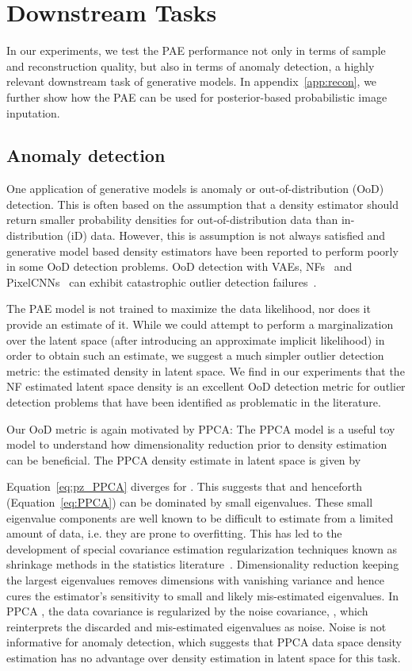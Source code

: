\documentclass[10pt]{article} \usepackage[accepted]{tmlr}
\newcommand{\rev}[1]{{\color{black}#1}}
\begin{document}
\section{Downstream Tasks}
In our experiments, we test the PAE performance not only in terms of sample and reconstruction quality, but also in terms of anomaly detection, a highly relevant downstream task of generative models. In appendix~\ref{app:recon}, we further show how the PAE can be used for posterior-based probabilistic image inputation.  

\subsection{Anomaly detection}
\label{sec:ood-detector}
One application of generative models is anomaly or out-of-distribution (OoD) detection. This is often based on the assumption that a density estimator should return smaller probability densities for out-of-distribution data than in-distribution (iD) data. However, this is assumption is not always satisfied and generative model based density estimators have been reported to perform poorly in some OoD detection problems. OoD detection with VAEs, NFs~\citep{glow} and PixelCNNs~\citep{OordKEKVG16} can exhibit catastrophic outlier detection failures~\citep{Nalisnick2019}.

The PAE model is not trained to maximize the data likelihood, nor does it provide an estimate of it. While we could attempt to perform a marginalization over the latent space (after introducing an approximate implicit likelihood) in order to obtain such an estimate, we suggest a much simpler outlier detection metric: the estimated density in latent space. We find in our experiments that the NF estimated latent space density is an excellent OoD detection metric for outlier detection problems that have been identified as problematic in the literature.

Our OoD metric is again motivated by PPCA:
The PPCA model is a useful toy model to understand how dimensionality reduction prior to density estimation can be beneficial. The PPCA density estimate in latent space is given by

Equation~\ref{eq:pz_PPCA} diverges 
for . This suggests that  and henceforth  (Equation~\ref{eq:PPCA}) can be dominated by small eigenvalues. \rev{These small eigenvalue components are well known to be difficult to estimate from a limited amount of data, i.e. they are prone to overfitting. This has led to the development of special covariance estimation regularization techniques known as shrinkage methods in the statistics literature~\citep{ChenOAS,LedoitWolf2004}.}
Dimensionality reduction keeping the largest eigenvalues removes dimensions with vanishing variance and hence cures the estimator's sensitivity to small \rev{and likely mis-estimated eigenvalues}.  In \rev{PPCA} , the data covariance  is regularized by the noise covariance, , \rev{which reinterprets the discarded  and mis-estimated eigenvalues as noise}. \rev{Noise is not informative for anomaly detection, which suggests that PPCA data space density estimation has no advantage over density estimation in latent space for this task.}
\end{document}
